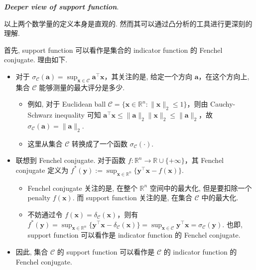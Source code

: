 \emph{\textbf{Deeper view of support function}}.

以上两个数学量的定义本身是直观的. 然而其可以通过凸分析的工具进行更深刻的理解.

首先, support function 可以看作是集合的 indicator function 的 Fenchel conjugate. 理由如下.

\begin{itemize}
\item {}对于 $\sigma_{\mathcal{C}}(\bm{a}) = \sup_{\bm{x} \in \mathcal{C}} \bm{a}^\top \bm{x}$，其关注的是, 给定一个方向 $\bm{a}$，在这个方向上, 集合 $\mathcal{C}$ 能够测量的最大评分是多少.

\begin{itemize}
\item {}例如, 对于 Euclidean ball $\mathcal{C} = \{\bm{x} \in \mathbb{R}^n: \|\bm{x}\|_2 \leq 1\}$，则由 Cauchy-Schwarz inequality 可知 $\bm{a}^\top \bm{x} \leq \|\bm{a}\|_2 \|\bm{x}\|_2 \leq \|\bm{a}\|_2$，故 $\sigma_{\mathcal{C}}(\bm{a}) = \|\bm{a}\|_2$.


\item {}这里从集合 $\mathcal{C}$ 转换成了一个函数 $\sigma_{\mathcal{C}}(\cdot)$.


\end{itemize}


\item {}联想到 Fenchel conjugate. 对于函数 $f: \mathbb{R}^n \to \mathbb{R} \cup \{+\infty\}$，其 Fenchel conjugate 定义为 $f^*(\bm{y}) := \sup_{\bm{x} \in \mathbb{R}^n} \{\bm{y}^\top \bm{x} - f(\bm{x})\}$.

\begin{itemize}
\item {}Fenchel conjugate 关注的是, 在整个 $\mathbb{R}^n$ 空间中的最大化, 但是要扣除一个 penalty $f(\bm{x})$. 而 support function 关注的是, 在集合 $\mathcal{C}$ 中的最大化.


\item {}不妨通过令 $f(\bm{x}) = \delta_{\mathcal{C}}(\bm{x})$，则有 $f^*(\bm{y}) = \sup_{\bm{x} \in \mathbb{R}^n} \{\bm{y}^\top \bm{x} - \delta_{\mathcal{C}}(\bm{x})\} = \sup_{\bm{x} \in \mathcal{C}} \bm{y}^\top \bm{x} = \sigma_{\mathcal{C}}(\bm{y})$. 也即, support function 可以看作是 indicator function 的 Fenchel conjugate.


\end{itemize}


\item {}因此, 集合 $\mathcal{C}$ 的 support function 可以看作是 $\mathcal{C}$ 的 indicator function 的 Fenchel conjugate.


\end{itemize}

